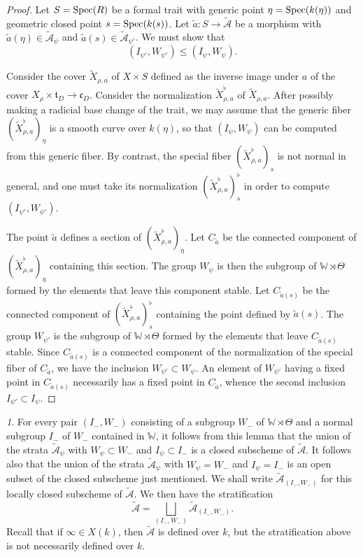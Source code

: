 \documentclass[12pt,english]{smfart}
\numberwithin{equation}{subsection}
\theoremstyle{remark}
\newtheorem{numero}[equation]{}
\newcommand\Spec{{\rm Spec}}
\begin{document}
\begin{proof}
Let $S=\Spec(R)$ be a formal trait with generic point $\eta=\Spec(k(\eta))$ and geometric closed point $s=\Spec(k(s))$. Let $\tilde a:S\rightarrow\tilde{\mathcal{A}}$ be a morphism with $\tilde a(\eta)\in\tilde{\mathcal{A}}_\psi$ and $\tilde a(s)\in\tilde{\mathcal{A}}_{\psi'}$. We must show that
$$(I_{\psi'},W_{\psi'})\leq (I_\psi,W_\psi).$$

Consider the cover $\widetilde X_{\rho,a}$ of $X\times S$ defined as the inverse image under $a$ of the cover $X_\rho\times\mathfrak{t}_D\rightarrow\mathfrak{c}_D$. Consider the normalization $\widetilde X_{\rho,a}^\flat$ of $\widetilde X_{\rho,a}$. After possibly making a radicial base change of the trait, we may assume that the generic fiber $(\widetilde X_{\rho,a}^\flat)_\eta$ is a smooth curve over $k(\eta)$, so that $(I_\psi,W_\psi)$ can be computed from this generic fiber. By contrast, the special fiber $(\widetilde X_{\rho,a}^\flat)_s$ is not normal in general, and one must take its normalization $(\widetilde X_{\rho,a}^\flat)_s^\flat$ in order to compute $(I_{\psi'},W_{\psi'})$.

The point $\tilde a$ defines a section of $(\widetilde X_{\rho,a}^\flat)_\eta$. Let $C_{\tilde a}$ be the connected component of $(\widetilde X_{\rho,a}^\flat)_\eta$ containing this section. The group $W_\psi$ is then the subgroup of $\mathbb{W}\rtimes\Theta$ formed by the elements that leave this component stable. Let $C_{\tilde a(s)}$ be the connected component of $(\widetilde X_{\rho,a}^\flat)_s^\flat$ containing the point defined by $\tilde a(s)$. The group $W_{\psi'}$ is the subgroup of $\mathbb{W}\rtimes\Theta$ formed by the elements that leave $C_{\tilde a(s)}$ stable. Since $C_{\tilde a(s)}$ is a connected component of the normalization of the special fiber of $C_{\tilde a}$, we have the inclusion $W_{\psi'}\subset W_\psi$. An element of $W_{\psi'}$ having a fixed point in $C_{\tilde a(s)}$ necessarily has a fixed point in $C_{\tilde a}$, whence the second inclusion $I_{\psi'}\subset I_\psi$.
\end{proof}

\begin{numero}\label{stratification monodromique}
For every pair $(I_-,W_-)$ consisting of a subgroup $W_-$ of $\mathbb{W}\rtimes\Theta$ and a normal subgroup $I_-$ of $W_-$ contained in $\mathbb{W}$, it follows from this lemma that the union of the strata $\tilde{\mathcal{A}}_\psi$ with $W_\psi\subset W_-$ and $I_\psi\subset I_-$ is a closed subscheme of $\tilde{\mathcal{A}}$. It follows also that the union of the strata $\tilde{\mathcal{A}}_\psi$ with $W_\psi=W_-$ and $I_\psi=I_-$ is an open subset of the closed subscheme just mentioned. We shall write $\tilde{\mathcal{A}}_{(I_-,W_-)}$ for this locally closed subscheme of $\tilde{\mathcal{A}}$. We then have the stratification
$$\tilde{\mathcal{A}}=\bigsqcup_{(I_-,W_-)}\tilde{\mathcal{A}}_{(I_-,W_-)}.$$
Recall that if $\infty\in X(k)$, then $\tilde{\mathcal{A}}$ is defined over $k$, but the stratification above is not necessarily defined over $k$.
\end{numero}
\end{document}
